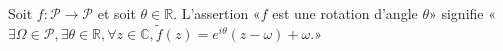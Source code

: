 Soit $f:\mathcal P\to \mathcal P$ et soit $\theta\in\mathbb R$. L'assertion «$f$ est une rotation d'angle $\theta$» signifie «$\exists \Omega\in\mathcal P, \exists \theta\in\mathbb R, \forall z\in\mathbb C, \tilde f(z)=e^{i\theta}(z-\omega)+\omega$.»

\begin{reponses}
\end{reponses}

